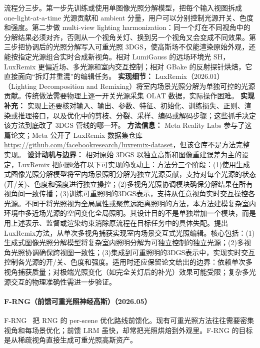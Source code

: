 流程分三步。第一步先训练或使用单图像光照分解模型，把每个输入视图拆成 one-light-at-a-time 光源贡献和 ambient 分量，用户可以分别控制光源开关、色度和强度。第二步做 multi-view lighting harmonization：同一个灯在不同视角中的分解结果必须对齐，否则从一个视角关灯、换到另一个视角又会变成不同效果。第三步把协调后的光照分解写入可重光照 3DGS，使高斯场不仅能渲染原始外观，还能按指定光源组合实时合成新视角。相对 LumiGauss 的远场环境光 SH，LuxRemix 更偏近场、多光源和室内交互控制；相对 GBake 的反射探针烘焙，它直接面向“拆灯并重混”的编辑任务。
\textbf{实现细节：} LuxRemix（2026.01） （Lighting Decomposition and Remixing）将室内场景光照分解为单独可控的光源贡献。传统做法需要物理上逐一开关光源采集 OLAT 数据，实际操作困难。
\textbf{实现补充：} 实现上还要核对输入、输出、参数、特征、初始化、训练损失、正则、渲染或推理接口，以及优化中的剪枝、分裂、采样、编码或解码步骤；这些抓手决定该方法到底改了 3DGS 管线的哪一环。
\textbf{方法信息：} Meta Reality Labs 参与了这篇论文；Meta 公开了 LuxRemix 数据集仓库 \url{https://github.com/facebookresearch/luxremix-dataset}，但该仓库不是方法完整实现。
\textbf{设计动机与边界：} 相对原始 3DGS 以独立高斯和图像重建误差为主的设定，LuxRemix 把问题落在以下可实现的改动上：方法分三个阶段：(1)使用生成式图像光照分解模型将室内场景照明分解为独立光源贡献，支持对每个光源的状态(开/关)、色度和强度进行独立操控；(2)多视角光照协调模块确保分解结果在所有视角间一致传播；(3)训练可重照明的3DGS表示，支持从任意视角实时交互操控各光源。不同于将光照视为全局属性或聚焦远距离照明的方法，本方法建模复杂室内环境中多近场光源的空间变化全局照明。其设计目的不是单独增加一个模块，而是用上述表示、监督或渲染约束消除原流程在目标任务中的具体失配。提出LuxRemix方法，从单次多视角捕获实现室内场景交互式光照编辑。核心包括：(1)生成式图像光照分解模型将复杂室内照明分解为可独立控制的独立光源；(2)多视角光照协调确保跨视图一致性；(3)集成到可重照明的3DGS表示中，实现实时交互控制各光源的开/关、色度和强度。适用时还应保留论文给出的边界：依赖单次多视角捕获质量；对极端光照变化（如完全关灯后的补光）效果可能受限；复杂多光源交互的物理准确性需进一步验证。
\paragraph{F-RNG（前馈可重光照神经高斯）（2026.05）}
F-RNG~\cite{2605_25975} 把 RNG 的 per-scene 优化路线前馈化。现有可重光照方法往往需要密集视角和每场景优化；前馈 LRM 虽快，却常把光照烘焙到外观里。F-RNG 的目标是从稀疏视角直接生成可重光照高斯资产。

